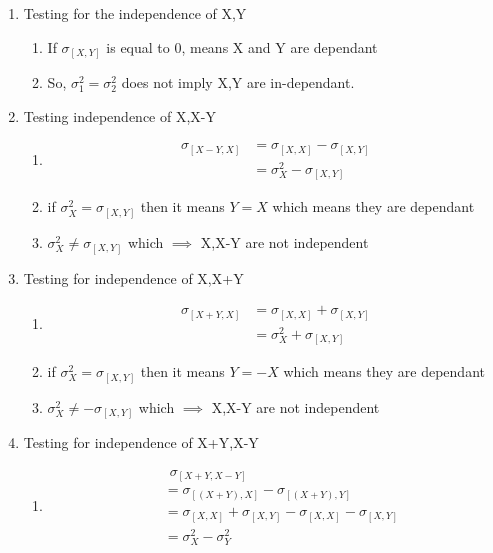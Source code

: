 \documentclass{article}
\begin{document}
\begin{enumerate}
\item \large{Testing for the independence of X,Y}
\begin{enumerate}
\item If $\sigma_{[X,Y]}$ is equal to 0, means X and Y are dependant
\item So, $\sigma_1^2 = \sigma_2^2$ does not imply X,Y are in-dependant.\\
\end{enumerate}

\item \large{Testing independence of X,X-Y}
\begin{enumerate}
\item \begin{align*}
    \sigma_{[X-Y,X]} &= \sigma_{[X,X]} - \sigma_{[X,Y]}\\
                     &= \sigma_{X}^2 - \sigma_{[X,Y]}
\end{align*}
\item if $\sigma_{X}^2 = \sigma_{[X,Y]}$ then it means $Y=X$ which means they are dependant\\
\item $\sigma_{X}^2 \neq \sigma_{[X,Y]}$ which $\implies$ X,X-Y are not independent\\
\end{enumerate}

\item \large Testing for independence of X,X+Y
\begin{enumerate}
\item \begin{align*}
   \sigma_{[X+Y,X]} &= \sigma_{[X,X]} + \sigma_{[X,Y]}\\
                     &= \sigma_{X}^2 + \sigma_{[X,Y]}
\end{align*}
\item if $\sigma_{X}^2 = \sigma_{[X,Y]}$ then it means $Y=-X$ which means they are dependant\\
\item $\sigma_{X}^2 \neq -\sigma_{[X,Y]}$ which $\implies$ X,X-Y are not independent\\
\end{enumerate}
\item \large{Testing for independence of X+Y,X-Y}
\begin{enumerate}
\item \begin{align*}
& \hspace{5pt} \sigma_{[X+Y, X-Y]}\\
&= \sigma_{[(X+Y), X]}- \sigma_{[(X+Y), Y]} \\
&= \sigma_{[X,X]} + \sigma_{[X,Y]} - \sigma_{[X,X]} - \sigma_{[X,Y]}  \\
&= \sigma_X^2 - \sigma_Y^2
\end{align*}


\end{enumerate}
\end{enumerate}
\end{document}
